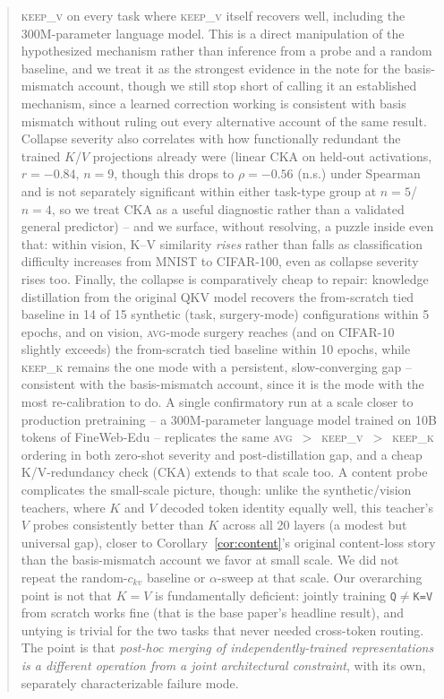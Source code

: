 \documentclass[11pt]{article}
\begin{document}
\begin{abstract}
\textsc{keep\_v} on every task where \textsc{keep\_v} itself recovers well,
including the 300M-parameter language model. This is a direct manipulation of the
hypothesized mechanism rather than inference from a probe and a random baseline, and
we treat it as the strongest evidence in the note for the basis-mismatch account,
though we still stop short of calling it an established mechanism, since a learned
correction working is consistent with basis mismatch without ruling out every
alternative account of the same result. Collapse severity
also correlates with how functionally redundant the trained $K$/$V$ projections
already were (linear CKA on held-out activations, $r=-0.84$, $n=9$, though this drops
to $\rho=-0.56$ (n.s.) under Spearman and is not separately significant within either
task-type group at $n=5$/$n=4$, so we treat CKA as a useful diagnostic rather than a
validated general predictor) -- and we surface, without resolving, a puzzle inside
even that: within vision, K--V similarity \emph{rises} rather than falls as
classification difficulty increases from MNIST to CIFAR-100, even as collapse severity
rises too. Finally, the collapse is comparatively cheap to repair: knowledge
distillation from the original QKV model recovers the from-scratch tied baseline in
14 of 15 synthetic (task, surgery-mode) configurations within 5 epochs, and on
vision, \textsc{avg}-mode surgery reaches (and on CIFAR-10 slightly exceeds) the
from-scratch tied baseline within 10 epochs, while \textsc{keep\_k} remains the one
mode with a
persistent, slow-converging gap -- consistent with the basis-mismatch account, since
it is the mode with the most re-calibration to do. A single confirmatory run at a
scale closer to production pretraining -- a 300M-parameter language model trained on
10B tokens of FineWeb-Edu -- replicates the same
\textsc{avg}~$>$~\textsc{keep\_v}~$>$~\textsc{keep\_k} ordering in both zero-shot
severity and post-distillation gap, and a cheap K/V-redundancy check (CKA) extends to
that scale too. A content probe complicates the small-scale picture, though: unlike
the synthetic/vision teachers, where $K$ and $V$ decoded token identity equally well,
this teacher's $V$ probes consistently better than $K$ across all 20 layers (a modest
but universal gap), closer to Corollary~\ref{cor:content}'s original content-loss
story than the basis-mismatch account we favor at small scale. We did not repeat the
random-$c_{kv}$ baseline or $\alpha$-sweep at that scale. Our overarching point is not that
$K=V$ is fundamentally deficient: jointly training \texttt{Q}$\neq$\texttt{K=V} from
scratch works fine (that is the base paper's headline result), and untying is trivial
for the two tasks that never needed cross-token routing. The point is that
\emph{post-hoc merging of independently-trained representations is a different
operation from a joint architectural constraint}, with its own, separately
characterizable failure mode.
\end{abstract}
\end{document}
